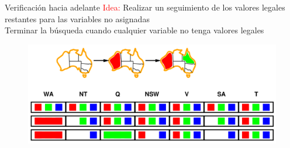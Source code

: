 \begin{frame}{Verificación hacia adelante}
\textcolor{red}{Idea:} Realizar un seguimiento de los valores legales restantes para las variables no asignadas\\
Terminar la búsqueda cuando cualquier variable no tenga valores legales
\begin{figure}
    \includegraphics[scale=0.25]{24_chap5_pag24.png}
\end{figure}
\end{frame}
